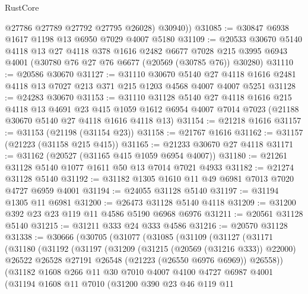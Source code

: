 \begin{lexlean}{RustCore}
\begin{coremodule}
          @27786
          @27789
          @27792
          @27795
          @26028)
        @30940))
@31085 := @30847 @6938 @1617 @1198 @13 @6950 @7029 @4007 @5180
@31109 := @20533
    @30670
    @5140
    @4118
    @13
    @27
    @4118
    @378
    @1616
    @2482
    @6677
    @7028
    @215
    @3995
    @6943
    @4001
    (@30780 @76 @27 @76 @6677 (@20569 (@30785 @76)) @30280)
@31110 := @20586 @30670
@31127 := @31110
    @30670
    @5140
    @27
    @4118
    @1616
    @2481
    @4118
    @13
    @7027
    @213
    @371
    @215
    @1203
    @4568
    @4007
    @4007
    @5251
@31128 := @24283 @30670
@31153 := @31110
    @31128
    @5140
    @27
    @4118
    @1616
    @215
    @4118
    @13
    @4691
    @23
    @415
    @1059
    @1612
    @6954
    @4007
    @7014
    @7023
    (@21188 @30670 @5140 @27 @4118 @1616 @4118 @13)
@31154 := @21218 @1616
@31157 := @31153 (@21198 (@31154 @23))
@31158 := @21767 @1616
@31162 := @31157 (@21223 (@31158 @215 @415))
@31165 := @21233 @30670 @27 @4118
@31171 := @31162 (@20527 (@31165 @415 @1059 @6954 @4007))
@31180 := @21261 @31128 @5140 @1077 @1611 @50 @13 @7014 @7021 @4933
@31182 := @21274 @31128 @5140
@31192 := @31182 @1305 @1610 @11 @49 @6981 @7013 @7020 @4727 @6959 @4001
@31194 := @24055 @31128 @5140
@31197 := @31194 @1305 @11 @6981
@31200 := @26473 @31128 @5140 @4118
@31209 := @31200 @392 @23 @23 @119 @11 @4586 @5190 @6968 @6976
@31211 := @20561 @31128 @5140
@31215 := @31211 @333 @24 @333 @4586
@31216 := @20570 @31128
@31338 := @30666
    (@30705
      (@31077
        (@31085
          (@31109
            (@31127
              (@31171
                (@31180
                  (@31192
                    (@31197
                      (@31209
                        (@31215 (@20569 (@31216 @333)) @22000)
                        @26522
                        @26528
                        @27191
                        @26548
                        (@21223 (@26550 @6976 @6969))
                        @26558))
                    (@31182
                      @1608
                      @266
                      @11
                      @30
                      @7010
                      @4007
                      @4100
                      @4727
                      @6987
                      @4001
                      (@31194
                        @1608
                        @11
                        @7010
                        (@31200
                          @390
                          @23
                          @46
                          @119
                          @11

\end{coremodule}
\end{lexlean}

